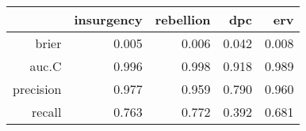 \begin{tabular}{rrrrr}
  \hline
 & insurgency & rebellion & dpc & erv \\ 
  \hline
brier & 0.005 & 0.006 & 0.042 & 0.008 \\ 
  auc.C & 0.996 & 0.998 & 0.918 & 0.989 \\ 
  precision & 0.977 & 0.959 & 0.790 & 0.960 \\ 
  recall & 0.763 & 0.772 & 0.392 & 0.681 \\ 
   \hline
\end{tabular}
